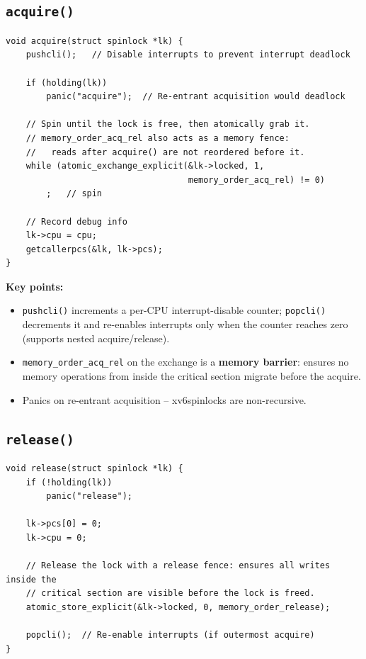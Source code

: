 \documentclass[11pt,a4paper]{article}
\newcommand{\term}[1]{\textbf{#1}}
\newcommand{\code}[1]{\texttt{#1}}
\newcommand{\xv}{xv6}
\begin{document}
\subsection{\texttt{acquire()}}

\begin{lstlisting}
void acquire(struct spinlock *lk) {
    pushcli();   // Disable interrupts to prevent interrupt deadlock

    if (holding(lk))
        panic("acquire");  // Re-entrant acquisition would deadlock

    // Spin until the lock is free, then atomically grab it.
    // memory_order_acq_rel also acts as a memory fence:
    //   reads after acquire() are not reordered before it.
    while (atomic_exchange_explicit(&lk->locked, 1,
                                    memory_order_acq_rel) != 0)
        ;   // spin

    // Record debug info
    lk->cpu = cpu;
    getcallerpcs(&lk, lk->pcs);
}
\end{lstlisting}

\textbf{Key points:}
\begin{itemize}
  \item \code{pushcli()} increments a per-CPU interrupt-disable counter;
    \code{popcli()} decrements it and re-enables interrupts only when the
    counter reaches zero (supports nested acquire/release).
  \item \code{memory\_order\_acq\_rel} on the exchange is a \term{memory
    barrier}: ensures no memory operations from inside the critical section
    migrate before the acquire.
  \item Panics on re-entrant acquisition -- \xv spinlocks are non-recursive.
\end{itemize}

\subsection{\texttt{release()}}

\begin{lstlisting}
void release(struct spinlock *lk) {
    if (!holding(lk))
        panic("release");

    lk->pcs[0] = 0;
    lk->cpu = 0;

    // Release the lock with a release fence: ensures all writes inside the
    // critical section are visible before the lock is freed.
    atomic_store_explicit(&lk->locked, 0, memory_order_release);

    popcli();  // Re-enable interrupts (if outermost acquire)
}
\end{lstlisting}
\end{document}
